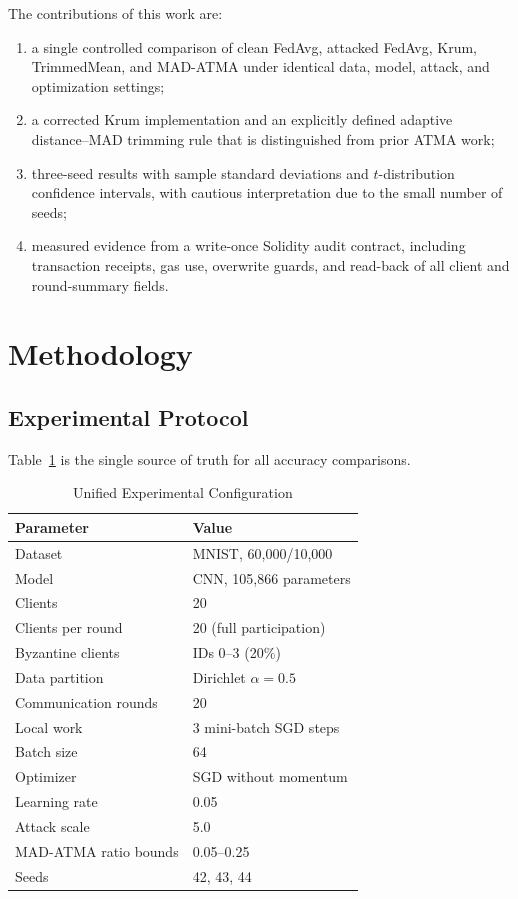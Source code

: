\documentclass[10pt,letterpaper]{article}
\begin{document}
The contributions of this work are:
\begin{enumerate}[leftmargin=*]
    \item a single controlled comparison of clean FedAvg, attacked FedAvg,
    Krum, TrimmedMean, and MAD-ATMA under identical data, model, attack, and
    optimization settings;
    \item a corrected Krum implementation and an explicitly defined adaptive
    distance--MAD trimming rule that is distinguished from prior ATMA work;
    \item three-seed results with sample standard deviations and
    $t$-distribution confidence intervals, with cautious interpretation due to
    the small number of seeds;
    \item measured evidence from a write-once Solidity audit contract,
    including transaction receipts, gas use, overwrite guards, and read-back of
    all client and round-summary fields.
\end{enumerate}

\section{Methodology}

\subsection{Experimental Protocol}

Table~\ref{tab:configuration} is the single source of truth for all accuracy
comparisons.

\begin{table}[t]
\caption{Unified Experimental Configuration}
\label{tab:configuration}
\centering
\small
\begin{tabular}{ll}
\toprule
Parameter & Value\\
\midrule
Dataset & MNIST, 60,000/10,000~\cite{lecun1998}\\
Model & CNN, 105,866 parameters\\
Clients & 20\\
Clients per round & 20 (full participation)\\
Byzantine clients & IDs 0--3 (20\%)\\
Data partition & Dirichlet $\alpha=0.5$\\
Communication rounds & 20\\
Local work & 3 mini-batch SGD steps\\
Batch size & 64\\
Optimizer & SGD without momentum\\
Learning rate & 0.05\\
Attack scale & 5.0\\
MAD-ATMA ratio bounds & 0.05--0.25\\
Seeds & 42, 43, 44\\
\bottomrule
\end{tabular}
\end{table}
\end{document}
